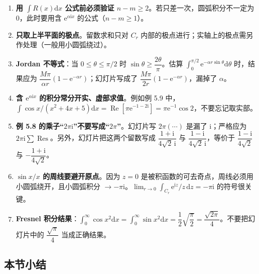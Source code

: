 \begin{enumerate}
\def\labelenumi{\arabic{enumi}.}
\tightlist
\item
  \textbf{用 \(\int R(x)\mathrm dx\) 公式前必须验证
  \(n-m\ge2\)}。若只差一次，圆弧积分不一定为 \(0\)，此时要用含
  \(\mathrm e^{\alpha\mathrm i x}\) 的公式（\(n-m\ge1\)）。
\item
  \textbf{只取上半平面的极点}。留数求和只对 \(C_r\)
  内部的极点进行；实轴上的极点需另作处理（一般用小圆弧绕过）。
\item
  \textbf{Jordan 不等式}：当 \(0\le\theta\le\pi/2\) 时
  \(\sin\theta\ge\dfrac{2\theta}{\pi}\)。估算
  \(\displaystyle\int_0^{\pi/2}\mathrm e^{-\alpha r\sin\theta}\mathrm d\theta\)
  时，结果应为
  \(\dfrac{M\pi}{\alpha r}(1-\mathrm e^{-\alpha r})\)；幻灯片写成了
  \(\dfrac{M\pi}{2r}(1-\mathrm e^{-\alpha r})\)，漏掉了 \(\alpha\)。
\item
  \textbf{含 \(\mathrm e^{\alpha\mathrm i x}\)
  的积分常分开实、虚部求值}。例如例 5.9
  中，\(\int\cos x/(x^2+4x+5)\mathrm dx=\operatorname{Re}[\pi\mathrm e^{-1-2\mathrm i}]=\pi\mathrm e^{-1}\cos2\)，不要忘记取实部。
\item
  \textbf{例 5.8
  的乘子``\(2\pi\mathrm i\)''不要写成``\(2\pi\)''}。幻灯片写
  \(2\pi\left(\cdots\right)\) 是漏了 \(\mathrm i\)；严格应为
  \(2\pi\mathrm i\sum\operatorname{Res}\)。另外，幻灯片把这两个留数写成
  \(\dfrac{1+\mathrm i}{4\sqrt2\,\mathrm i}\) 与
  \(\dfrac{1-\mathrm i}{4\sqrt2\,\mathrm i}\)，等价于
  \(\dfrac{1-\mathrm i}{4\sqrt2}\) 与
  \(-\dfrac{1+\mathrm i}{4\sqrt2}\)。
\item
  \textbf{\(\sin x/x\) 的周线要避开原点}。因为 \(z=0\)
  是被积函数的可去奇点，周线必须用小圆弧绕开，且小圆弧积分
  \(\to-\pi\mathrm i\)。\(\lim_{r\to0}\int_{C_r}\mathrm e^{\mathrm i z}/z\,\mathrm dz=-\pi\mathrm i\)
  的符号很关键。
\item
  \textbf{Fresnel
  积分结果}：\(\int_0^\infty\cos x^2\mathrm dx=\int_0^\infty\sin x^2\mathrm dx=\dfrac12\sqrt{\dfrac{\pi}{2}}=\dfrac{\sqrt{2\pi}}{4}\)。不要把幻灯片中的
  \(\dfrac{\sqrt\pi}{4}\) 当成正确结果。
\end{enumerate}

\subsection{本节小结}\label{ux672cux8282ux5c0fux7ed3-13}

